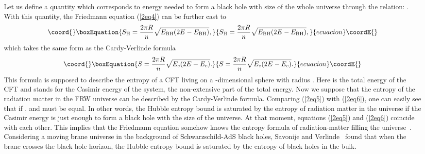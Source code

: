 \documentclass[a4paper,12pt]{article}
\begin{document}
Let us  define a quantity \coordHE{} which corresponds to energy
needed to form a black hole with size of the whole universe
through the relation: \coordHE{}. With this quantity, the Friedmann equation (\ref{2eq4}) can
be further cast to
\begin{equation}\coord{}\boxEquation{
\label{2eq5}
 S_{\rm H}=\frac{2\pi R}{n}\sqrt{E_{\rm BH}(2E-E_{\rm BH})},
}{
S_{\rm H}=\frac{2\pi R}{n}\sqrt{E_{\rm BH}(2E-E_{\rm BH})},
}{ecuacion}\coordE{}\end{equation}
which takes the same form as the Cardy-Verlinde formula~\cite{Verl}
\begin{equation}\coord{}\boxEquation{
\label{2eq6}
  S=\frac{2\pi R}{n}\sqrt{E_c(2E-E_c)}.
}{
S=\frac{2\pi R}{n}\sqrt{E_c(2E-E_c)}.
}{ecuacion}\coordE{}\end{equation}
This formula is supposed to describe the entropy \coordHE{} of a CFT
living on a \coordHE{}-dimensional sphere with radius \coordHE{}. Here \coordHE{} is
the total energy of the CFT and \coordHE{} stands for the Casimir
energy of the system, the non-extensive part of the total energy.
Now we suppose that the entropy of the radiation matter in the FRW
universe can be described by the Cardy-Verlinde formula. Comparing
(\ref{2eq5}) with (\ref{2eq6}), one can easily see that if
\coordHE{}, \coordHE{} and \coordHE{} must be equal. In other
words, the Hubble entropy bound is saturated by the entropy
of radiation matter in the universe if the Casimir energy \coordHE{} is
just enough to form a black hole with the size of the universe.
At that moment, equations (\ref{2eq5}) and (\ref{2eq6}) coincide with
each other.  This implies that the Friedmann equation
somehow knows the entropy formula of radiation-matter filling the
universe~\cite{Verl}. Considering a moving brane universe in the
background of Schwarzschild-AdS black holes, Savonije and
Verlinde~\cite{SV} found that when the brane crosses the black
hole horizon, the Hubble entropy bound is saturated by the entropy of
black holes in the bulk.
\end{document}
